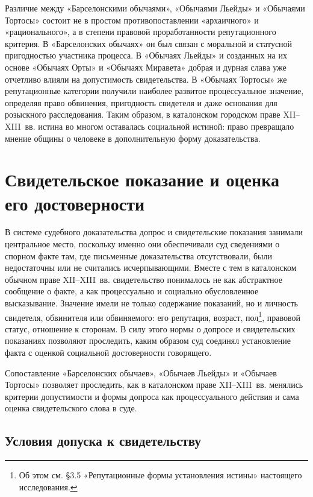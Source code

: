 Различие между «Барселонскими обычаями», «Обычаями Льейды» и «Обычаями Тортосы» состоит не в простом противопоставлении «архаичного» и «рационального», а в степени правовой проработанности репутационного критерия. В «Барселонских обычаях» он был связан с моральной и статусной пригодностью участника процесса. В «Обычаях Льейды» и созданных на их основе «Обычаях Орты» и «Обычаях Миравета» добрая и дурная слава уже отчетливо влияли на допустимость свидетельства. В «Обычаях Тортосы» же репутационные категории получили наиболее развитое процессуальное значение, определяя право обвинения, пригодность свидетеля и даже основания для розыскного расследования. Таким образом, в каталонском городском праве XII--XIII~вв. истина во многом оставалась социальной истиной: право превращало мнение общины о человеке в дополнительную форму доказательства.

\section{Свидетельское показание и оценка его достоверности}

В системе судебного доказательства допрос и свидетельские показания занимали центральное место, поскольку именно они обеспечивали суд сведениями о спорном факте там, где письменные доказательства отсутствовали, были недостаточны или не считались исчерпывающими. Вместе с тем в каталонском обычном праве XII--XIII~вв. свидетельство понималось не как абстрактное сообщение о факте, а как процессуально и социально обусловленное высказывание. Значение имели не только содержание показаний, но и личность свидетеля, обвинителя или обвиняемого: его репутация, возраст, пол\footnote{Об этом см. §3.5 «Репутационные формы установления истины» настоящего исследования.}, правовой статус, отношение к сторонам. В силу этого нормы о допросе и свидетельских показаниях позволяют проследить, каким образом суд соединял установление факта с оценкой социальной достоверности говорящего.

Сопоставление «Барселонских обычаев», «Обычаев Льейды» и «Обычаев Тортосы» позволяет проследить, как в каталонском праве XII--XIII~вв. менялись критерии допустимости и формы допроса как процессуального действия и сама оценка свидетельского слова в суде.

\subsection{Условия допуска к свидетельству}

